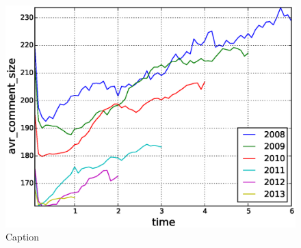 \begin{figure}[!tb]
\centering
\includegraphics[scale=0.4]{./images/avr_comment_size_cohorts.eps}
\caption{Caption}
\label{fig:fig_label}
\end{figure}

